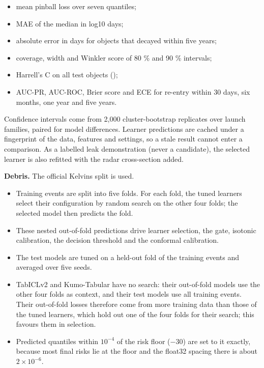 \documentclass[
]{article}
\providecommand{\tightlist}{%
  \setlength{\itemsep}{0pt}\setlength{\parskip}{0pt}}
\begin{document}
\begin{itemize}
\tightlist
\item
  mean pinball loss over seven quantiles;
\item
  MAE of the median in log10 days;
\item
  absolute error in days for objects that decayed within five years;
\item
  coverage, width and Winkler score of 80 \% and 90 \% intervals;
\item
  Harrell's C on all test objects
  ();
\item
  AUC-PR, AUC-ROC, Brier score and ECE for re-entry within 30 days, six
  months, one year and five years.
\end{itemize}

Confidence intervals come from 2,000 cluster-bootstrap replicates over
launch families, paired for model differences. Learner predictions are
cached under a fingerprint of the data, features and settings, so a
stale result cannot enter a comparison. As a labelled leak demonstration
(never a candidate), the selected learner is also refitted with the
radar cross-section added.

\textbf{Debris.} The official Kelvins split is used.

\begin{itemize}
\tightlist
\item
  Training events are split into five folds. For each fold, the tuned
  learners select their configuration by random search on the other four
  folds; the selected model then predicts the fold.
\item
  These nested out-of-fold predictions drive learner selection, the
  gate, isotonic calibration, the decision threshold and the conformal
  calibration.
\item
  The test models are tuned on a held-out fold of the training events
  and averaged over five seeds.
\item
  TabICLv2 and Kumo-Tabular have no search: their out-of-fold models use
  the other four folds as context, and their test models use all
  training events. Their out-of-fold losses therefore come from more
  training data than those of the tuned learners, which hold out one of
  the four folds for their search; this favours them in selection.
\item
  Predicted quantiles within \(10^{-4}\) of the risk floor (−30) are set
  to it exactly, because most final risks lie at the floor and the
  float32 spacing there is about \(2\times10^{-6}\).
\end{itemize}
\end{document}
